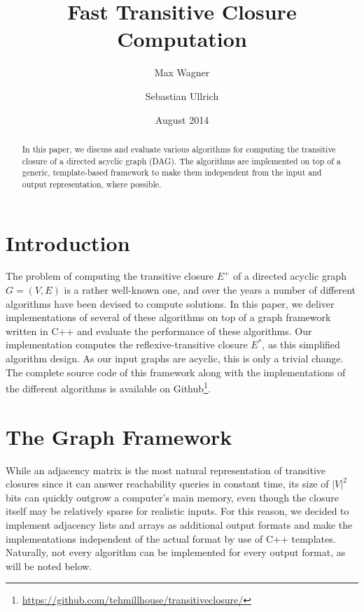 \documentclass[12pt,a4paper,twoside]{article}
\begin{document}
\title{Fast Transitive Closure Computation}
\author{Max Wagner \and Sebastian Ullrich}
\date{August 2014}
\maketitle

\def\sectionautorefname{Section}
\def\subsectionautorefname{Subsection}

\newcommand\ie{i.e.\ }
\newcommand\eg{e.g.,\ }
\newcommand\credits[1]{\begin{flushright}\emph{#1}\end{flushright}}
\newcommand\abs[1]{\left|#1\right|}
\newcommand\BigOh[1]{\mathcal{O}\left(#1\right)}

\begin{abstract}
  In this paper, we discuss and evaluate various algorithms for computing the transitive closure of a directed acyclic graph (DAG). The algorithms are implemented on top of a generic, template-based framework to make them independent from the input and output representation, where possible.
\end{abstract}

\section{Introduction}

The problem of computing the transitive closure $E^+$ of a directed acyclic graph $G = (V,E)$ is a rather well-known one, and over the years a number of different algorithms have been devised to compute solutions. In this paper, we deliver implementations of several of these algorithms on top of a graph framework written in C++ and evaluate the performance of these algorithms. Our implementation computes the reflexive-transitive closure $E^*$, as this simplified algorithm design. As our input graphs are acyclic, this is only a trivial change. The complete source code of this framework along with the implementations of the different algorithms is available on Github\footnote{\url{https://github.com/tehmillhouse/transitiveclosure/}}.

\section{The Graph Framework}

While an adjacency matrix is the most natural representation of transitive closures since it can answer reachability queries in constant time, its size of $\abs{V}^2$ bits can quickly outgrow a computer's main memory, even though the closure itself may be relatively sparse for realistic inputs. For this reason, we decided to implement adjacency lists and arrays as additional output formats and make the implementations independent of the actual format by use of C++ templates. Naturally, not every algorithm can be implemented for every output format, as will be noted below.
\end{document}
